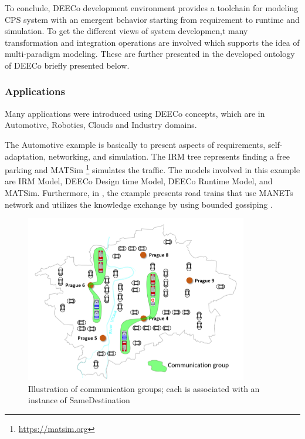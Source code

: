  To conclude, DEECo development environment provides a toolchain for modeling CPS system with an emergent behavior starting from requirement to runtime and simulation. To get the different views of system developmen,t many transformation and integration operations are involved which supports the idea of multi-paradigm modeling. These are further presented in the developed ontology of DEECo briefly presented below.
 
 
 
\subsubsection{Applications}
  Many applications were introduced using DEECo concepts, which are in Automotive, Robotics, Clouds and Industry domains. 
 
 The Automotive example \cite{Hoch2015emobi} is basically to present aspects of requirements, self-adaptation, networking, and simulation. The IRM tree represents finding a free parking and MATSim \footnote{\url{https://matsim.org}} simulates the traffic. The models involved in this example are IRM Model, DEECo Design time Model, DEECo Runtime Model, and MATSim. Furthermore, in  \cite{Kit2015empl}, the example presents road trains that use MANETs network and utilizes the knowledge exchange by using bounded gossiping \cite{10.1007/978-3-319-09970-5_23}.

\begin{figure}[!htb]
\centering
\includegraphics[width = \textwidth]{figures/gossip}
\caption{Illustration of communication groups; each is associated with an instance of SameDestination}
\label{fig:gossip}
\end{figure}

